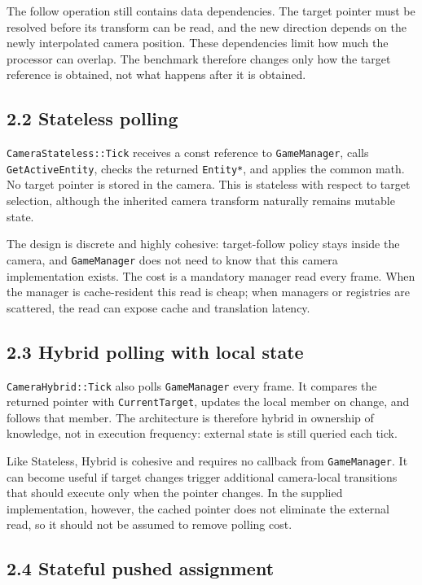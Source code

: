 The follow operation still contains data dependencies. The target pointer must be resolved before its transform can be read, and the new direction depends on the newly interpolated camera position. These dependencies limit how much the processor can overlap. The benchmark therefore changes only how the target reference is obtained, not what happens after it is obtained.

\subsection{2.2 Stateless polling}

\texttt{CameraStateless::Tick} receives a const reference to \texttt{GameManager}, calls \texttt{GetActiveEntity}, checks the returned \texttt{Entity*}, and applies the common math. No target pointer is stored in the camera. This is stateless with respect to target selection, although the inherited camera transform naturally remains mutable state.

The design is discrete and highly cohesive: target-follow policy stays inside the camera, and \texttt{GameManager} does not need to know that this camera implementation exists. The cost is a mandatory manager read every frame. When the manager is cache-resident this read is cheap; when managers or registries are scattered, the read can expose cache and translation latency.

\subsection{2.3 Hybrid polling with local state}

\texttt{CameraHybrid::Tick} also polls \texttt{GameManager} every frame. It compares the returned pointer with \texttt{CurrentTarget}, updates the local member on change, and follows that member. The architecture is therefore hybrid in ownership of knowledge, not in execution frequency: external state is still queried each tick.

Like Stateless, Hybrid is cohesive and requires no callback from \texttt{GameManager}. It can become useful if target changes trigger additional camera-local transitions that should execute only when the pointer changes. In the supplied implementation, however, the cached pointer does not eliminate the external read, so it should not be assumed to remove polling cost.

\subsection{2.4 Stateful pushed assignment}

